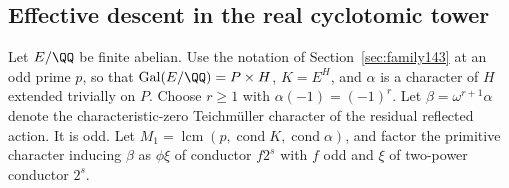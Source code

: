 \documentclass[a4paper,11pt]{article}
\theoremstyle{definition}
\theoremstyle{remark}
\numberwithin{equation}{section}
\begin{document}
\subsection{Effective descent in the real cyclotomic tower}\label{nav:III-23}
\label{sec:effect146}

Let \(E/\QQ\) be finite abelian. Use the notation of
Section~\ref{sec:family143} at an odd prime \(p\), so that
\(\operatorname{Gal}(E/\QQ)=P\times H\), \(K=E^H\), and
\(\alpha\) is a character of \(H\) extended trivially on \(P\).
Choose \(r\ge1\) with \(\alpha(-1)=(-1)^r\). Let
\(\beta=\omega^{r+1}\alpha\) denote the characteristic-zero
Teichm\"uller character of the residual reflected action.
It is odd. Let \(M_1=\operatorname{lcm}(p,\operatorname{cond}K,
\operatorname{cond}\alpha)\), and factor the primitive character
inducing \(\beta\) as \(\phi\xi\) of conductor \(f2^s\) with
\(f\) odd and \(\xi\) of two-power conductor \(2^s\).
\end{document}
